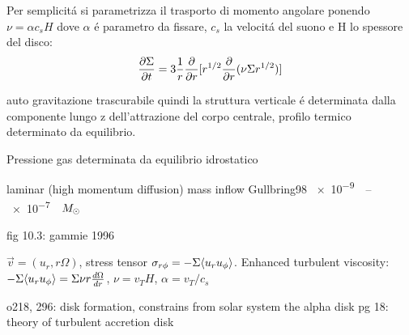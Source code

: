 Per semplicit\'a si parametrizza il trasporto di momento angolare ponendo $\nu=\alpha c_s H$ dove $\alpha$ \'e parametro da fissare, $c_s$ la velocit\'a del suono e H lo spessore del disco:
\begin{equation}
\frac{\partial \Sigma}{\partial t}=3\frac{1}{r}\frac{\partial}{\partial r}[r^{1/2}\frac{\partial}{\partial r}(\nu\Sigma r^{1/2})]\label{eq:sigmaevol}
\end{equation}

auto gravitazione trascurabile quindi la struttura verticale \'e determinata dalla componente lungo z dell'attrazione del corpo centrale, profilo termico determinato da equilibrio.

\begin{workout}
Pressione gas determinata da equilibrio idrostatico
\end{workout}

\begin{workout}
laminar (high momentum diffusion)
mass inflow Gullbring98 \SIrange{e-9}{e-7}{\per\year}$M_{\odot}{}$
\end{workout}
\begin{workout}[MRI]
fig 10.3:
gammie 1996
\end{workout}

\begin{workout}
$\vec{v}=(u_r,r\Omega)$, stress tensor $\sigma_{r\phi}=-\Sigma\langle u_ru_{\phi} \rangle$.
Enhanced turbulent viscosity: $-\Sigma\langle u_ru_{\phi} \rangle=\Sigma\nu r\frac{d \Omega}{d r}$, $\nu=v_TH$, $\alpha=v_T/c_s$
\end{workout}

\begin{workout}
o218, 296: disk formation, constrains from solar system
the alpha disk pg 18: theory of turbulent accretion disk
\end{workout}

\begin{workout}

\end{workout}

